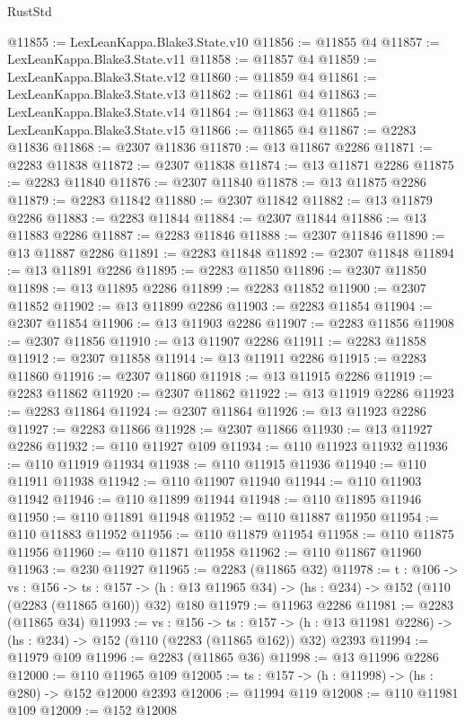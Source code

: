 \begin{lexlean}{RustStd}
\begin{coremodule}
@11855 := LexLeanKappa.Blake3.State.v10
@11856 := @11855 @4
@11857 := LexLeanKappa.Blake3.State.v11
@11858 := @11857 @4
@11859 := LexLeanKappa.Blake3.State.v12
@11860 := @11859 @4
@11861 := LexLeanKappa.Blake3.State.v13
@11862 := @11861 @4
@11863 := LexLeanKappa.Blake3.State.v14
@11864 := @11863 @4
@11865 := LexLeanKappa.Blake3.State.v15
@11866 := @11865 @4
@11867 := @2283 @11836
@11868 := @2307 @11836
@11870 := @13 @11867 @2286
@11871 := @2283 @11838
@11872 := @2307 @11838
@11874 := @13 @11871 @2286
@11875 := @2283 @11840
@11876 := @2307 @11840
@11878 := @13 @11875 @2286
@11879 := @2283 @11842
@11880 := @2307 @11842
@11882 := @13 @11879 @2286
@11883 := @2283 @11844
@11884 := @2307 @11844
@11886 := @13 @11883 @2286
@11887 := @2283 @11846
@11888 := @2307 @11846
@11890 := @13 @11887 @2286
@11891 := @2283 @11848
@11892 := @2307 @11848
@11894 := @13 @11891 @2286
@11895 := @2283 @11850
@11896 := @2307 @11850
@11898 := @13 @11895 @2286
@11899 := @2283 @11852
@11900 := @2307 @11852
@11902 := @13 @11899 @2286
@11903 := @2283 @11854
@11904 := @2307 @11854
@11906 := @13 @11903 @2286
@11907 := @2283 @11856
@11908 := @2307 @11856
@11910 := @13 @11907 @2286
@11911 := @2283 @11858
@11912 := @2307 @11858
@11914 := @13 @11911 @2286
@11915 := @2283 @11860
@11916 := @2307 @11860
@11918 := @13 @11915 @2286
@11919 := @2283 @11862
@11920 := @2307 @11862
@11922 := @13 @11919 @2286
@11923 := @2283 @11864
@11924 := @2307 @11864
@11926 := @13 @11923 @2286
@11927 := @2283 @11866
@11928 := @2307 @11866
@11930 := @13 @11927 @2286
@11932 := @110 @11927 @109
@11934 := @110 @11923 @11932
@11936 := @110 @11919 @11934
@11938 := @110 @11915 @11936
@11940 := @110 @11911 @11938
@11942 := @110 @11907 @11940
@11944 := @110 @11903 @11942
@11946 := @110 @11899 @11944
@11948 := @110 @11895 @11946
@11950 := @110 @11891 @11948
@11952 := @110 @11887 @11950
@11954 := @110 @11883 @11952
@11956 := @110 @11879 @11954
@11958 := @110 @11875 @11956
@11960 := @110 @11871 @11958
@11962 := @110 @11867 @11960
@11963 := @230 @11927
@11965 := @2283 (@11865 @32)
@11978 := {t : @106} ->
  {vs : @156} ->
  {ts : @157} -> (h : @13 @11965 @34) -> (hs : @234) -> @152 (@110 (@2283 (@11865 @160)) @32) @180
@11979 := @11963 @2286
@11981 := @2283 (@11865 @34)
@11993 := {vs : @156} ->
  {ts : @157} ->
  (h : @13 @11981 @2286) -> (hs : @234) -> @152 (@110 (@2283 (@11865 @162)) @32) @2393
@11994 := @11979 @109
@11996 := @2283 (@11865 @36)
@11998 := @13 @11996 @2286
@12000 := @110 @11965 @109
@12005 := {ts : @157} -> (h : @11998) -> (hs : @280) -> @152 @12000 @2393
@12006 := @11994 @119
@12008 := @110 @11981 @109
@12009 := @152 @12008

\end{coremodule}
\end{lexlean}
